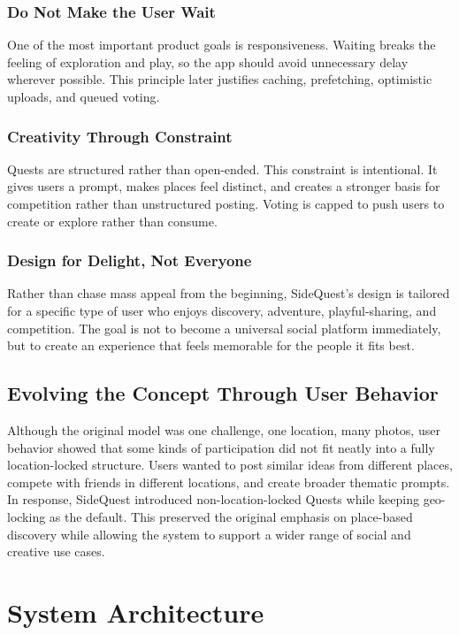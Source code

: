 \documentclass[12pt,a4paper,oneside]{report}
\begin{document}
\subsection{Do Not Make the User Wait}
One of the most important product goals is responsiveness. Waiting breaks the feeling of exploration and play, so the app should avoid unnecessary delay wherever possible. This principle later justifies caching, prefetching, optimistic uploads, and queued voting.

\subsection{Creativity Through Constraint}
Quests are structured rather than open-ended. This constraint is intentional. It gives users a prompt, makes places feel distinct, and creates a stronger basis
for competition rather than unstructured posting. Voting is capped to push users to create or explore rather than consume.

\subsection{Design for Delight, Not Everyone}
Rather than chase mass appeal from the beginning, SideQuest's design is tailored for a specific type of user who enjoys discovery, adventure, playful-sharing, and competition. The goal is not to become a universal social platform immediately, but to create an experience that feels memorable for the people it fits best.

\section{Evolving the Concept Through User Behavior}
Although the original model was one challenge, one location, many photos, user behavior showed that some kinds of participation did not fit neatly into a fully location-locked structure. Users wanted to post similar ideas from different places, compete with friends in different locations, and create broader thematic prompts. In response, SideQuest introduced non-location-locked Quests while keeping geo-locking as the default. This preserved the original emphasis on place-based discovery while allowing the system to support a wider range of social and creative use cases.

\chapter{System Architecture}
\label{ch:system}
\end{document}
